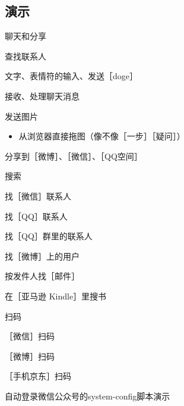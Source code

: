 \documentclass[presentation,dvipdfmx,CJKbookmarks]{beamer}
\begin{document}
\begin{CJK*}{UTF8}{simsun}
\section{演示}
\label{sec:orgfe5271c}
\begin{frame}[label={sec:org4bcc0bb}]{聊天和分享}
\begin{block}{查找联系人}
\end{block}
\begin{block}{文字、表情符的输入、发送［doge］}
\end{block}
\begin{block}{接收、处理聊天消息}
\end{block}
\begin{block}{发送图片}
\begin{itemize}
\item 从浏览器直接拖图（像不像［一步］［疑问］）
\end{itemize}
\end{block}
\begin{block}{分享到［微博］、［微信］、［QQ空间］}
\end{block}
\end{frame}


\begin{frame}[label={sec:org9a12964}]{搜索}
\begin{block}{找［微信］联系人}
\end{block}
\begin{block}{找［QQ］联系人}
\end{block}
\begin{block}{找［QQ］群里的联系人}
\end{block}
\begin{block}{找［微博］上的用户}
\end{block}
\begin{block}{按发件人找［邮件］}
\end{block}
\begin{block}{在［亚马逊 Kindle］里搜书}
\end{block}
\end{frame}

\begin{frame}[label={sec:orgffe710a}]{扫码}
\begin{block}{［微信］扫码}
\end{block}
\begin{block}{［微博］扫码}
\end{block}
\begin{block}{［手机京东］扫码}
\end{block}
\begin{block}{自动登录微信公众号的\thinspace system-config\thinspace 脚本演示}
\end{block}
\end{frame}


\end{CJK*}
\end{document}
